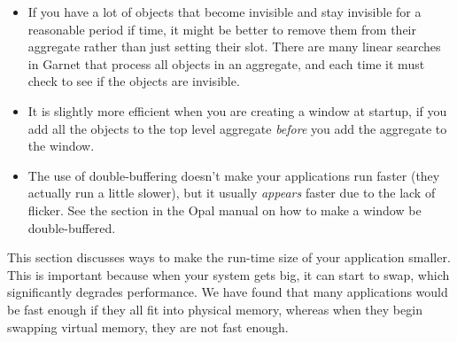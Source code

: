\begin{itemize}
\item If you have a lot of objects that become invisible and stay invisible
for a reasonable period if time, it might be better to remove them
from their aggregate rather than just setting their 
slot.  There are many linear searches in Garnet that process all
objects in an aggregate, and each time it must check to see if the
objects are invisible.

\item It is slightly more efficient when you are creating a window at
startup, if you add all the objects to the top level aggregate
{\it before} you add the aggregate to the window.

\item The use of double-buffering doesn't make your applications
run faster (they actually run a little slower), but it usually
{\it appears} faster due to the lack of flicker.  See the section in the
Opal manual on how to make a window be double-buffered.
\end{itemize}

This section discusses ways to make the run-time size of your
application smaller.  This is important because when your system gets
big, it can start to swap, which significantly degrades performance.
We have found that many applications would be fast enough if they all
fit into physical memory, whereas when they begin swapping virtual
memory, they are not fast enough.

